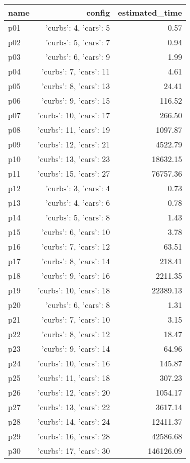 \documentclass{article}
\begin{document}
                            \begin{center}
                            \scriptsize
                            \begin{tabular}{@{}l|r|r@{}}
                            name & config & estimated\_time\\\midrule
                              p01&{'curbs': 4, 'cars': 5}&0.57\\
  p02&{'curbs': 5, 'cars': 7}&0.94\\
  p03&{'curbs': 6, 'cars': 9}&1.99\\
  p04&{'curbs': 7, 'cars': 11}&4.61\\
  p05&{'curbs': 8, 'cars': 13}&24.41\\
  p06&{'curbs': 9, 'cars': 15}&116.52\\
  p07&{'curbs': 10, 'cars': 17}&266.50\\
  p08&{'curbs': 11, 'cars': 19}&1097.87\\
  p09&{'curbs': 12, 'cars': 21}&4522.79\\
  p10&{'curbs': 13, 'cars': 23}&18632.15\\
  p11&{'curbs': 15, 'cars': 27}&76757.36\\
  p12&{'curbs': 3, 'cars': 4}&0.73\\
  p13&{'curbs': 4, 'cars': 6}&0.78\\
  p14&{'curbs': 5, 'cars': 8}&1.43\\
  p15&{'curbs': 6, 'cars': 10}&3.78\\
  p16&{'curbs': 7, 'cars': 12}&63.51\\
  p17&{'curbs': 8, 'cars': 14}&218.41\\
  p18&{'curbs': 9, 'cars': 16}&2211.35\\
  p19&{'curbs': 10, 'cars': 18}&22389.13\\
  p20&{'curbs': 6, 'cars': 8}&1.31\\
  p21&{'curbs': 7, 'cars': 10}&3.15\\
  p22&{'curbs': 8, 'cars': 12}&18.47\\
  p23&{'curbs': 9, 'cars': 14}&64.96\\
  p24&{'curbs': 10, 'cars': 16}&145.87\\
  p25&{'curbs': 11, 'cars': 18}&307.23\\
  p26&{'curbs': 12, 'cars': 20}&1054.17\\
  p27&{'curbs': 13, 'cars': 22}&3617.14\\
  p28&{'curbs': 14, 'cars': 24}&12411.37\\
  p29&{'curbs': 16, 'cars': 28}&42586.68\\
  p30&{'curbs': 17, 'cars': 30}&146126.09
                            \end{tabular}
                            \end{center}
                    
\end{document}
